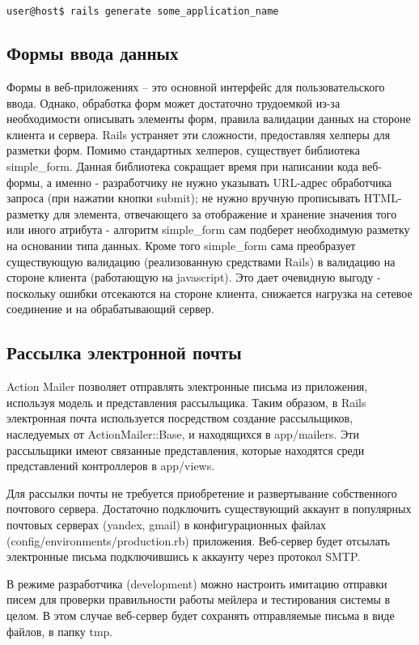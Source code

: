 \begin{lstlisting}[language=Bash,caption=Создание
нового приложения,label={lst:rails_new_application}] 
user@host$ rails generate some_application_name
\end{lstlisting}

\subsection{Формы ввода данных}
Формы в веб-приложениях – это основной интерфейс для пользовательского ввода.
Однако, обработка форм может достаточно трудоемкой из-за необходимости описывать
элементы форм, правила валидации данных на стороне клиента и сервера. Rails
устраняет эти сложности, предоставляя хелперы для разметки форм. Помимо
стандартных хелперов, существует библиотека simple\_form. Данная библиотека
сокращает время при написании кода веб-формы, а именно - разработчику не нужно
указывать URL-адрес обработчика запроса (при нажатии кнопки submit); не нужно
вручную прописывать HTML-разметку для элемента, отвечающего за отображение и
хранение значения того или иного атрибута - алгоритм simple\_form сам подберет
необходимую разметку на основании типа данных. Кроме того simple\_form сама
преобразует существующую валидацию (реализованную средствами Rails) в валидацию
на стороне клиента (работающую на javascript). Это дает очевидную выгоду -
поскольку ошибки отсекаются на стороне клиента, снижается нагрузка на сетевое
соединение и на обрабатывающий сервер.

\subsection{Рассылка  электронной почты}
Action Mailer позволяет отправлять электронные письма из приложения, используя
модель и представления рассыльщика. Таким образом, в Rails электронная почта
используется посредством создание рассыльщиков, наследуемых от
ActionMailer::Base, и находящихся в app/mailers. Эти рассыльщики имеют связанные
представления, которые находятся среди представлений контроллеров в app/views.

Для рассылки почты не требуется приобретение и развертывание собственного
почтового сервера. Достаточно подключить существующий аккаунт в популярных
почтовых серверах (yandex, gmail) в конфигурационных файлах
(config/environments/production.rb) приложения. Веб-сервер будет отсылать
электронные письма подключившись к аккаунту через протокол SMTP.

В режиме разработчика (development) можно настроить имитацию отправки писем для
проверки правильности работы мейлера и тестирования системы в целом. В этом
случае веб-сервер будет сохранять отправляемые письма в виде файлов, в папку
tmp.

